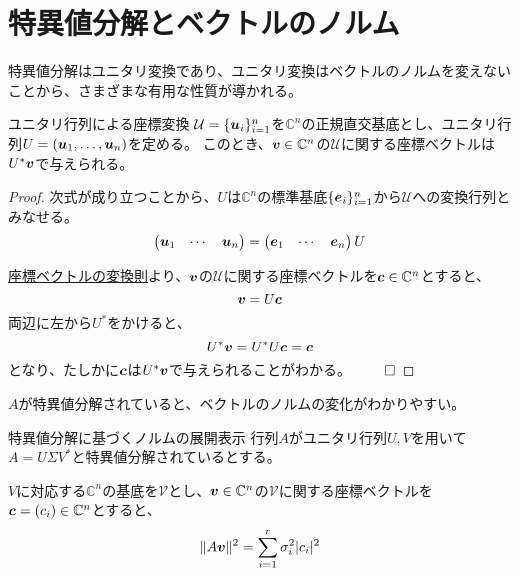 \documentclass[../../../topic_linear-algebra]{subfiles}
\begin{document}
\sectionline
\section{特異値分解とベクトルのノルム}

特異値分解はユニタリ変換であり、ユニタリ変換はベクトルのノルムを変えないことから、さまざまな有用な性質が導かれる。

\begin{theorem}{ユニタリ行列による座標変換}\label{thm:unitary-coordinate-transform}
  $\mathcal{U} = \{ \vb*{u}_i \}_{i=1}^n$を$\mathbb{C}^n$の正規直交基底とし、ユニタリ行列$U = (\vb*{u}_1, \ldots, \vb*{u}_n)$を定める。
  このとき、$\vb*{v} \in \mathbb{C}^n$の$\mathcal{U}$に関する座標ベクトルは$U^*\vb*{v}$で与えられる。
\end{theorem}

\begin{proof}
  次式が成り立つことから、$U$は$\mathbb{C}^n$の標準基底$\{ \vb*{e}_i \}_{i=1}^n$から$\mathcal{U}$への変換行列とみなせる。
  \begin{equation*}
    \begin{pmatrix}
      \vb*{u}_1 & \cdots & \vb*{u}_n
    \end{pmatrix} = \begin{pmatrix}
      \vb*{e}_1 & \cdots & \vb*{e}_n
    \end{pmatrix} U
  \end{equation*}
  
  \hyperref[thm:coordinate-change-rule]{座標ベクトルの変換則}より、$\vb*{v}$の$\mathcal{U}$に関する座標ベクトルを$\vb*{c} \in \mathbb{C}^n$とすると、
  \begin{equation*}
    \vb*{v} = U \vb*{c}
  \end{equation*}
  両辺に左から$U^*$をかけると、
  \begin{equation*}
    U^* \vb*{v} = U^* U \vb*{c} = \vb*{c}
  \end{equation*}
  となり、たしかに$\vb*{c}$は$U^* \vb*{v}$で与えられることがわかる。 $\qed$
\end{proof}

\br

$A$が特異値分解されていると、ベクトルのノルムの変化がわかりやすい。

\begin{theorem}{特異値分解に基づくノルムの展開表示}\label{thm:norm-expansion-svd}
  行列$A$がユニタリ行列$U,V$を用いて$A = U \Sigma V^*$と特異値分解されているとする。
  
  $V$に対応する$\mathbb{C}^n$の基底を$\mathcal{V}$とし、$\vb*{v} \in \mathbb{C}^n$の$\mathcal{V}$に関する座標ベクトルを$\vb*{c} = (c_i) \in \mathbb{C}^n$とすると、
  \begin{equation*}
    \| A \vb*{v} \|^2 = \sum_{i=1}^r \sigma_i^2 |c_i|^2
  \end{equation*}
\end{theorem}
\end{document}
